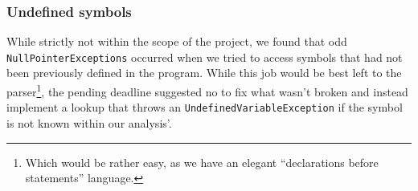 \subsubsection{Undefined symbols}
While strictly not within the scope of the project, we found that odd \texttt{NullPointerExceptions} occurred when we tried to access symbols that had not been previously defined in the program. While this job would be best left to the parser\footnote{Which would be rather easy, as we have an elegant ``declarations before statements'' language.}, the pending deadline suggested no to fix what wasn't broken and instead implement a lookup that throws an \texttt{UndefinedVariableException} if the symbol is not known within our analysis'.

